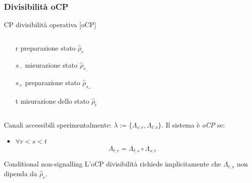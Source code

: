 \documentclass{beamer}
\begin{document}
\begin{frame}
\frametitle{Divisibilità oCP}
\begin{block}{CP divisibilità operativa [oCP]}
	\begin{columns}
		\begin{column}{0.5\textwidth}
			\begin{itemize}
				\item[r] preparazione stato \(\hat{\rho}_r\)
				\item[\(s_-\)] misurazione stato \(\hat{\rho}_{s_-}\)
				\item[\(s_+\)] preparazione stato \(\hat{\rho}_{s_+}\)
				\item[t] misurazione dello stato \(\hat{\rho}_t\)
			\end{itemize}
	    \end{column}
        \begin{column}{0.5\textwidth}
        	\resizebox{\textwidth}{!}{}
        \end{column}	
    \end{columns}
	Canali accessibili sperimentalmente: \(\lambda := \{\Lambda_{s\colon r},\Lambda_{t\colon s}\}\). Il sistema è \emph{oCP} se:
	\begin{itemize}
		\item \(\forall r<s<t\)
		\[\Lambda_{t\colon r} = \Lambda_{t\colon s} \circ \Lambda_{s\colon r}\]
	\end{itemize}
\end{block}
\pause
\begin{exampleblock}{Conditional non-signalling}
	L'oCP divisibilità richiede implicitamente che \(\Lambda_{t\colon s}\) non dipenda da \(\hat{\rho}_r\).
\end{exampleblock}
\end{frame}
\end{document}
